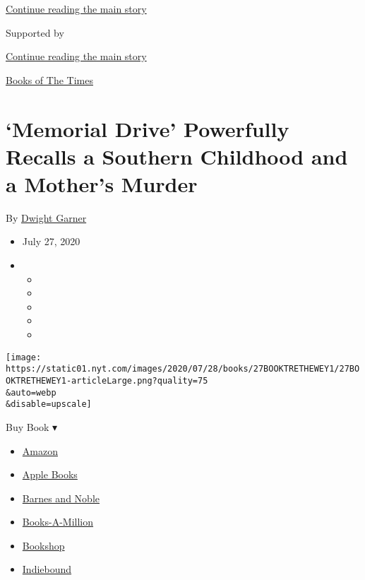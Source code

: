\protect\hyperlink{after-top}{Continue reading the main story}

Supported by

\protect\hyperlink{after-sponsor}{Continue reading the main story}

\href{/column/books-of-the-times}{Books of The Times}

\hypertarget{memorial-drive-powerfully-recalls-a-southern-childhood-and-a-mothers-murder}{%
\section{`Memorial Drive' Powerfully Recalls a Southern Childhood and a
Mother's
Murder}\label{memorial-drive-powerfully-recalls-a-southern-childhood-and-a-mothers-murder}}

By \href{https://www.nytimes.com/by/dwight-garner}{Dwight Garner}

\begin{itemize}
\item
  July 27, 2020
\item
  \begin{itemize}
  \item
  \item
  \item
  \item
  \item
  \end{itemize}
\end{itemize}

\texttt{[image: https://static01.nyt.com/images/2020/07/28/books/27BOOKTRETHEWEY1/27BOOKTRETHEWEY1-articleLarge.png?quality=75\\\&auto=webp\\\&disable=upscale]}

Buy Book ▾

\begin{itemize}
\tightlist
\item
  \href{https://www.amazon.com/gp/search?index=books\&tag=NYTBSREV-20\&field-keywords=Memorial+Drive+Natasha+Trethewey}{Amazon}
\item
  \href{https://du-gae-books-dot-nyt-du-prd.appspot.com/buy?title=Memorial+Drive\&author=Natasha+Trethewey}{Apple
  Books}
\item
  \href{https://www.anrdoezrs.net/click-7990613-11819508?url=https\%3A\%2F\%2Fwww.barnesandnoble.com\%2Fw\%2F\%3Fean\%3D9780062248572}{Barnes
  and Noble}
\item
  \href{https://www.anrdoezrs.net/click-7990613-35140?url=https\%3A\%2F\%2Fwww.booksamillion.com\%2Fp\%2FMemorial\%2BDrive\%2FNatasha\%2BTrethewey\%2F9780062248572}{Books-A-Million}
\item
  \href{https://bookshop.org/a/3546/9780062248572}{Bookshop}
\item
  \href{https://www.indiebound.org/book/9780062248572?aff=NYT}{Indiebound}
\end{itemize}

